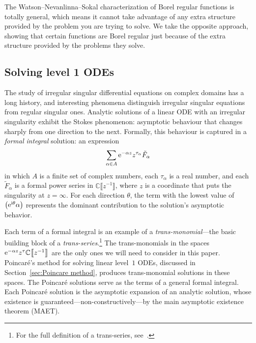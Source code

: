 \documentclass[pdftex]{sigma}
\let\Re\relax
\DeclareMathOperator{\Re}{Re}
\newcommand{\C}{\mathbb{C}}
\newcommand{\series}[1]{\tilde{#1}}
\numberwithin{equation}{section}
\begin{document}
The Watson--Nevanlinna--Sokal characterization of Borel regular functions is totally general, which means it cannot take advantage of any extra structure provided by the problem you are trying to solve. We take the opposite approach, showing that certain functions are Borel regular just because of the extra structure provided by the problems they solve.
%
\subsection[Solving level 1 ODEs]{Solving level 1 ODEs}\label{sec:history_ODE}
%
The study of irregular singular differential equations on complex domains has a long history, and interesting phenomena distinguish irregular singular equations from regular singular ones. Analytic solutions of a linear ODE with an irregular singularity exhibit the Stokes phenomenon: asymptotic behaviour that changes sharply from one direction to the next. Formally, this behaviour is captured in a {\em formal integral} solution: an expression
\[ \sum_{\alpha \in A} {\rm e}^{-\alpha z} z^{\tau_\alpha} \series{F}_\alpha \]
in which $A$ is a finite set of complex numbers, each $\tau_\alpha$ is a real number, and each $\series{F}_\alpha$ is a formal power series in $\C\big\llbracket z^{-1} \big\rrbracket$, where $z$ is a coordinate that puts the singularity at $z = \infty$. For each direction $\theta$, the term with the lowest value of $\Re\bigl({\rm e}^{{\rm i}\theta} \alpha\bigr)$ represents the dominant contribution to the solution's asymptotic behavior.

Each term of a formal integral is an example of a {\em trans-monomial}---the basic building block of a {\em trans-series}.\footnote{For the full definition of a trans-series, see~\cite{costin_transseries,costin_summability,van-der-hoeven2001complex,EcalleIII}.} The trans-monomials in the spaces ${\rm e}^{-\alpha z} z^\tau \C\big\llbracket z^{-1} \big\rrbracket$ are the only ones we will need to consider in this paper. Poincar\'e's method for solving linear level~$1$ ODEs, discussed in Section~\ref{sec:Poincare method}, produces trans-monomial solutions in these spaces. The Poincar\'e solutions serve as the terms of a general formal integral. Each Poincar\'e solution is the asymptotic expansion of an analytic solution, whose existence is guaranteed---non-constructively---by the main asymptotic existence theorem (MAET).
\end{document}
